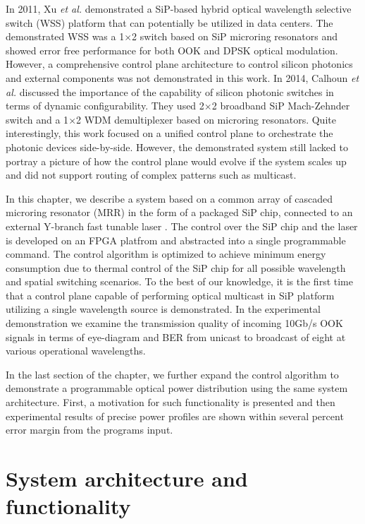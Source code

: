 In 2011, Xu \textit{et al.} \cite{xu2011hybrid} demonstrated a SiP-based hybrid optical wavelength selective switch (WSS) platform that can potentially be utilized in data centers. The demonstrated WSS was a 1$\times$2 switch based on SiP microring resonators and showed error free performance for both OOK and DPSK optical modulation. However, a comprehensive control plane architecture to control silicon photonics and external components was not demonstrated in this work. In 2014, Calhoun \textit{et al.} \cite{calhoun2014dynamic} discussed the importance of the capability of silicon photonic switches in terms of dynamic configurability. They used 2$\times$2 broadband SiP Mach-Zehnder switch and a 1$\times$2 WDM demultiplexer based on microring resonators. Quite interestingly, this work focused on a unified control plane to orchestrate the photonic devices side-by-side. However, the demonstrated system still lacked to portray a picture of how the control plane would evolve if the system scales up and did not support routing of complex patterns such as multicast. 

In this chapter, we describe a system based on a common array of cascaded microring resonator (MRR) in the form of a packaged SiP chip, connected to an external Y-branch fast tunable laser \cite{browning2013optical}. The control over the SiP chip and the laser is developed on an FPGA platfrom and abstracted into a single programmable command. The control algorithm is optimized to achieve minimum energy consumption due to thermal control \cite{biberman2008thermally} of the SiP chip for all possible wavelength and spatial switching scenarios. To the best of our knowledge, it is the first time that a control plane capable of performing optical multicast in SiP platform utilizing a single wavelength source is demonstrated. In the experimental demonstration we examine the transmission quality of incoming 10Gb/s OOK signals in terms of eye-diagram and BER from unicast to broadcast of eight at various operational wavelengths. 

In the last section of the chapter, we further expand the control algorithm to demonstrate a programmable optical power distribution using the same system architecture. First, a motivation for such functionality is presented and then experimental results of precise power profiles are shown within several percent error margin from the programs input.

\section{System architecture and functionality}


